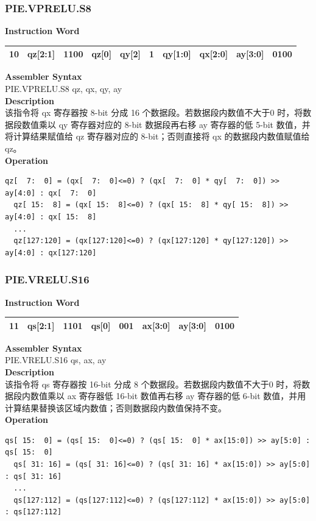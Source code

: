\newpage
\subsubsection{PIE.VPRELU.S8}\label{instruction:PIEVPRELUS8}
\setlength\tabcolsep{6pt}
\textbf{Instruction Word} \\
\begin{tabular}{|c|c|c|c|c|c|c|c|c|c|}
	\hline
	10 & qz[2:1] & 1100 & qz[0] & qy[2] & 1 & qy[1:0] & qx[2:0] & ay[3:0] & 0100 \\
	\hline
\end{tabular}

\textbf{Assembler Syntax} \\
PIE.VPRELU.S8 qz, qx, qy, ay \\
\textbf{Description} \\
该指令将 qx 寄存器按 8-bit 分成 16 个数据段。若数据段内数值不大于0 时，将数据段数值乘以 qy 寄存器对应的 8-bit 数据段再右移 ay 寄存器的低 5-bit 数值，并将计算结果赋值给 qz 寄存器对应的 8-bit；否则直接将 qx 的数据段内数值赋值给 qz。\\
\textbf{Operation}
\begin{lstlisting}[escapeinside=`?]
  qz[  7:  0] = (qx[  7:  0]<=0) ? (qx[  7:  0] * qy[  7:  0]) >> ay[4:0] : qx[  7:  0]
  qz[ 15:  8] = (qx[ 15:  8]<=0) ? (qx[ 15:  8] * qy[ 15:  8]) >> ay[4:0] : qx[ 15:  8]
  ...
  qz[127:120] = (qx[127:120]<=0) ? (qx[127:120] * qy[127:120]) >> ay[4:0] : qx[127:120]
\end{lstlisting}

\newpage
\subsubsection{PIE.VRELU.S16}\label{instruction:PIEVRELUS16}
\setlength\tabcolsep{6pt}
\textbf{Instruction Word} \\
\begin{tabular}{|c|c|c|c|c|c|c|c|}
	\hline
	11 & qs[2:1] & 1101 & qs[0] & 001 & ax[3:0] & ay[3:0] & 0100 \\
	\hline
\end{tabular}

\textbf{Assembler Syntax} \\
PIE.VRELU.S16 qs, ax, ay \\
\textbf{Description} \\
该指令将 qs 寄存器按 16-bit 分成 8 个数据段。若数据段内数值不大于0 时，将数据段内数值乘以 ax 寄存器低 16-bit 数值再右移 ay 寄存器的低 6-bit 数值，并用计算结果替换该区域内数值；否则数据段内数值保持不变。\\
\textbf{Operation}
\begin{lstlisting}[escapeinside=`?]
  qs[ 15:  0] = (qs[ 15:  0]<=0) ? (qs[ 15:  0] * ax[15:0]) >> ay[5:0] : qs[ 15:  0]
  qs[ 31: 16] = (qs[ 31: 16]<=0) ? (qs[ 31: 16] * ax[15:0]) >> ay[5:0] : qs[ 31: 16]
  ...
  qs[127:112] = (qs[127:112]<=0) ? (qs[127:112] * ax[15:0]) >> ay[5:0] : qs[127:112]
\end{lstlisting}

